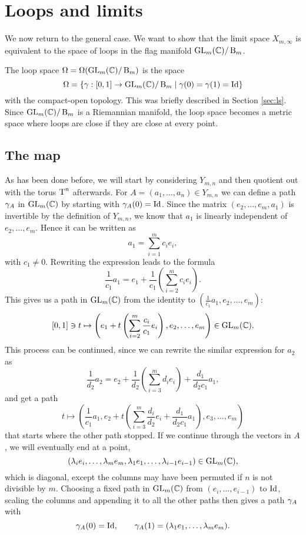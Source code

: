 
\chapter{Loops and limits} 
\label{chap:loekker}

We now return to the general case. We want to show that the limit
space
$X_{m,\infty}$ is equivalent to the space of loops in the flag
manifold $\operatorname{GL}_{m}(\mathbb{C})/\operatorname{B}_{m}$.

\begin{definition}
  The loop space $\Omega = \Omega(\operatorname{GL}_{m}(\mathbb{C})/\operatorname{B}_{m})$ is the space
  \[ \Omega = \left\{ \gamma : [0,1] \to \operatorname{GL}_{m}(\mathbb{C})/\operatorname{B}_{m} \mid \gamma(0) = \gamma(1) =
    \operatorname{Id} \right\} \]
  with the compact-open topology. This was briefly described in
  Section \ref{sec:ls}. Since $\operatorname{GL}_{m}(\mathbb{C})/\operatorname{B}_{m}$ is a Riemannian manifold, the
  loop space becomes a metric space where loops are close if they are
  close at every point.
\end{definition}

\section{The map}

As has been done before, we will start by considering $Y_{m,n}$ and
then quotient out with the torus $\operatorname{T}^n$ afterwards.
For $A = (a_1,\dots,a_n)\in Y_{m,n}$ we
can define a path $ \gamma_A$ in $\operatorname{GL}_m(\mathbb{C})$ by starting with
$\gamma_A(0) = \operatorname{Id}$. Since the matrix $(e_2,\dots,e_m,a_1)$ is
invertible by the definition of $Y_{m,n}$, we know that $a_1$ is
linearly independent of $e_2,\dots,e_m$. Hence it can be written as
\[ a_1 = \sum_{i=1}^m c_i e_i, \]
with $c_1 \neq 0$. Rewriting the expression leads to the formula
\[  \frac{1}{c_1} a_1= e_1 + \frac{1}{c_1} \left(\sum_{i=2}^m c_i
  e_i\right). \]
This gives us a path in $\operatorname{GL}_m(\mathbb{C})$ from the identity to
$\left(\frac{1}{c_1} a_1,e_2,\dots,e_m\right)$:
\[ [0,1]\ni t \mapsto \left( e_1 + t\left(\sum_{i=2}^m
    \frac{c_i}{c_1}e_i\right),e_2,\dots,e_m \right) \in \operatorname{GL}_m(\mathbb{C}). \]
This process can be continued, since we can rewrite the similar
expression for $a_2$ as
\[ \frac{1}{d_2}a_2 = e_2 + \frac{1}{d_2}\left(\sum_{i=3}^m d_i
  e_i\right) + \frac{d_1}{d_2c_1}a_1, \]
and get a path
\[ t\mapsto \left(\frac{1}{c_1}a_1,e_2+t\left(\sum_{i=3}^m
    \frac{d_i}{d_2}e_i +
    \frac{d_1}{d_2c_1}a_1\right),e_3,\dots,e_m\right) \]
that starts where the other path stopped. If we continue through the
vectors in $A$, we will eventually end at a point,
\[ (\lambda_i e_i,\dots,\lambda_me_m,\lambda_1e_1,\dots,\lambda_{i-1}e_{i-1})\in \operatorname{GL}_m(\mathbb{C}), \]
which is diagonal, except the columns may have been
permuted if $n$ is not divisible by $m$. Choosing a fixed path in
$\operatorname{GL}_m(\mathbb{C})$ from $(e_i,\dots,e_{i-1})$ to $\operatorname{Id}$, scaling the columns and
appending it to all the other paths then gives a path $ \gamma_A$ with
\[  \gamma_A(0) = \operatorname{Id}, \qquad \gamma_A(1) =
(\lambda_1e_1,\dots,\lambda_me_m). \]

